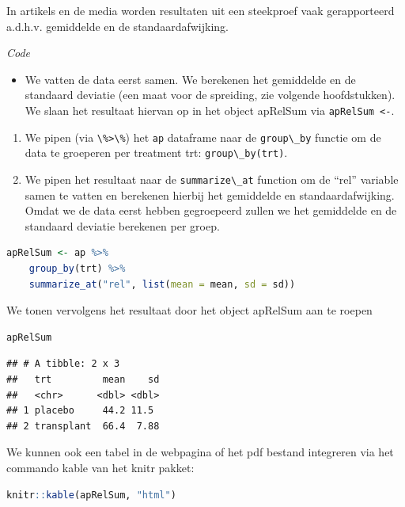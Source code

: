 \documentclass[
  12pt,dutch,coursenotes]{book}
\newcommand{\passthrough}[1]{#1}
\providecommand{\tightlist}{%
  \setlength{\itemsep}{0pt}\setlength{\parskip}{0pt}}
\theoremstyle{definition}
\theoremstyle{definition}
\theoremstyle{definition}
\theoremstyle{definition}
\theoremstyle{remark}
\begin{document}
In artikels en de media worden resultaten uit een steekproef vaak gerapporteerd a.d.h.v. gemiddelde en de standaardafwijking.

\emph{Code}

\begin{itemize}
\tightlist
\item
  We vatten de data eerst samen. We berekenen het gemiddelde en de standaard deviatie (een maat voor de spreiding, zie volgende hoofdstukken).
  We slaan het resultaat hiervan op in het object apRelSum via \passthrough{\lstinline!apRelSum <-!}.
\end{itemize}

\begin{enumerate}
\def\labelenumi{\arabic{enumi}.}
\item
  We pipen (via \passthrough{\lstinline!\%>\%!}) het \passthrough{\lstinline!ap!} dataframe naar de \passthrough{\lstinline!group\_by!} functie om de data te groeperen per treatment trt: \passthrough{\lstinline!group\_by(trt)!}.
\item
  We pipen het resultaat naar de \passthrough{\lstinline!summarize\_at!} function om de ``rel'' variable samen te vatten en berekenen hierbij het gemiddelde en standaardafwijking. Omdat we de data eerst hebben gegroepeerd zullen we het gemiddelde en de standaard deviatie berekenen per groep.
\end{enumerate}

\begin{lstlisting}[language=R]
apRelSum <- ap %>%
    group_by(trt) %>%
    summarize_at("rel", list(mean = mean, sd = sd))
\end{lstlisting}

We tonen vervolgens het resultaat door het object apRelSum aan te roepen

\begin{lstlisting}[language=R]
apRelSum
\end{lstlisting}

\begin{lstlisting}
## # A tibble: 2 x 3
##   trt         mean    sd
##   <chr>      <dbl> <dbl>
## 1 placebo     44.2 11.5 
## 2 transplant  66.4  7.88
\end{lstlisting}

We kunnen ook een tabel in de webpagina of het pdf bestand integreren via het commando kable van het knitr pakket:

\begin{lstlisting}[language=R]
knitr::kable(apRelSum, "html")
\end{lstlisting}
\end{document}
